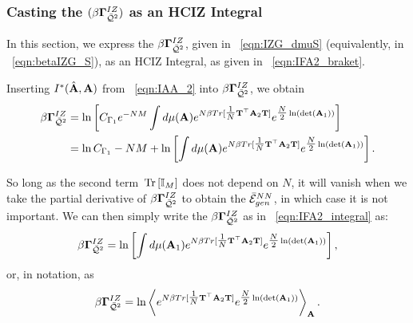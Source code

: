 \subsubsection{Casting the \GeneratingFunction $(\beta\mathbf{\Gamma}^{IZ}_{\bar{\mathcal{Q}}^{2}})$ as an HCIZ Integral}
\label{sxn:TraceLogDerivation_B}

In this section, we express the \GeneratingFunction $\beta\mathbf{\Gamma}^{IZ}_{\bar{\mathcal{Q}}^{2}}$, 
given in \EQN~\ref{eqn:IZG_dmuS} (equivalently, in \EQN~\ref{eqn:betaIZG_S}), 
as an HCIZ Integral, 
as given in \EQN~\ref{eqn:IFA2_braket}.

Inserting $I^{*}(\hat{\mathbf{A}},\mathbf{A})$ from \EQN~\ref{eqn:IAA_2} into $\beta\mathbf{\Gamma}^{IZ}_{\bar{\mathcal{Q}}^{2}}$, we obtain
\begin{align}
  \label{eqn:IZG_IAA}
  \beta\mathbf{\Gamma}^{IZ}_{\bar{\mathcal{Q}}^{2}} 
  & =  \ln \left[ C_{\Gamma_1} e^{-NM}\int d\mu(\mathbf{A})
  e^{N\beta Tr[ \tfrac{1}{N}{\mathbf{T}}^{\top}\mathbf{A}_{2}{\mathbf{T}}] }
  e^{\tfrac{N}{2}\ln(\mbox{}{\text{det}}\left(\mathbf{A}_{1}\right))}\right]  \\ \nonumber
  & =
    \ln  C_{\Gamma_1}
  - NM
  +  \ln \left[ \int d\mu(\mathbf{A})
    e^{N\beta Tr[ \tfrac{1}{N}{\mathbf{T}}^{\top}\mathbf{A}_{2}{\mathbf{T}}] }
    e^{\tfrac{N}{2}\ln(\mbox{}{\text{det}}\left(\mathbf{A}_{1}\right))}\right]  .
\end{align}

\noindent
So long as  the second term $\mbox{}\operatorname{Tr}\left[\mathbb{I}_{M}\right]$ does not depend on $N$, 
it will vanish when we take the partial derivative of $\beta\mathbf{\Gamma}^{IZ}_{\bar{\mathcal{Q}}^{2}}$ to obtain the $\bar{\mathcal{E}}^{NN}_{gen}$, in which case it is not important.  
We can then simply write the \GeneratingFunction $\beta\mathbf{\Gamma}^{IZ}_{\bar{\mathcal{Q}}^{2}}$  as in \EQN~\ref{eqn:IFA2_integral} as:
\begin{align}
  \label{eqn:IZG_integral}
  \beta\mathbf{\Gamma}^{IZ}_{\bar{\mathcal{Q}}^{2}} 
   =  \ln \left[ \int d\mu(\mathbf{A}_{1})
    e^{N\beta Tr[ \tfrac{1}{N}{\mathbf{T}}^{\top}\mathbf{A}_{2}{\mathbf{T}}] }
    e^{\tfrac{N}{2}\ln(\mbox{}{\text{det}}\left(\mathbf{A}_{1}\right))}\right]  ,
\end{align}
or, in \BraKet notation, as
\begin{align}
  \label{eqn:IZG_braket}
  \beta\mathbf{\Gamma}^{IZ}_{\bar{\mathcal{Q}}^{2}} = 
   \ln\left\langle
  e^{N\beta Tr[ \tfrac{1}{N}{\mathbf{T}}^{\top}\mathbf{A}_{2}{\mathbf{T}}] }
  e^{\tfrac{N}{2}\ln(\mbox{}{\text{det}}\left(\mathbf{A}_{1}\right))}
  \right\rangle_{\mathbf{A}}   .
\end{align}


